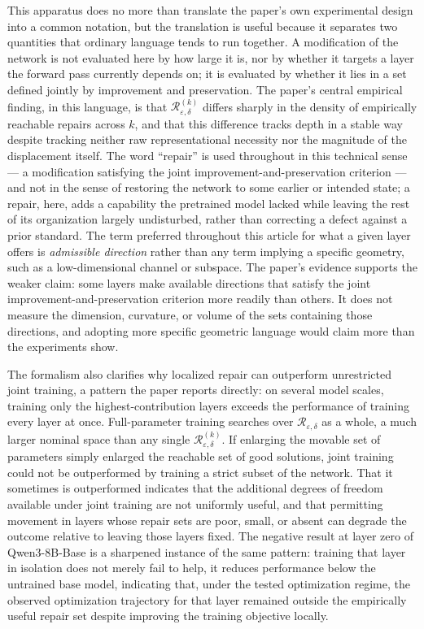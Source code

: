 \documentclass[11pt]{article}
\begin{document}
This apparatus does no more than translate the paper's own experimental design into a common notation, but the translation is useful because it separates two quantities that ordinary language tends to run together. A modification of the network is not evaluated here by how large it is, nor by whether it targets a layer the forward pass currently depends on; it is evaluated by whether it lies in a set defined jointly by improvement and preservation. The paper's central empirical finding, in this language, is that $\mathcal{R}^{(k)}_{\varepsilon,\delta}$ differs sharply in the density of empirically reachable repairs across $k$, and that this difference tracks depth in a stable way despite tracking neither raw representational necessity nor the magnitude of the displacement itself. The word ``repair'' is used throughout in this technical sense --- a modification satisfying the joint improvement-and-preservation criterion --- and not in the sense of restoring the network to some earlier or intended state; a repair, here, adds a capability the pretrained model lacked while leaving the rest of its organization largely undisturbed, rather than correcting a defect against a prior standard. The term preferred throughout this article for what a given layer offers is \emph{admissible direction} rather than any term implying a specific geometry, such as a low-dimensional channel or subspace. The paper's evidence supports the weaker claim: some layers make available directions that satisfy the joint improvement-and-preservation criterion more readily than others. It does not measure the dimension, curvature, or volume of the sets containing those directions, and adopting more specific geometric language would claim more than the experiments show.

The formalism also clarifies why localized repair can outperform unrestricted joint training, a pattern the paper reports directly: on several model scales, training only the highest-contribution layers exceeds the performance of training every layer at once. Full-parameter training searches over $\mathcal{R}_{\varepsilon,\delta}$ as a whole, a much larger nominal space than any single $\mathcal{R}^{(k)}_{\varepsilon,\delta}$. If enlarging the movable set of parameters simply enlarged the reachable set of good solutions, joint training could not be outperformed by training a strict subset of the network. That it sometimes is outperformed indicates that the additional degrees of freedom available under joint training are not uniformly useful, and that permitting movement in layers whose repair sets are poor, small, or absent can degrade the outcome relative to leaving those layers fixed. The negative result at layer zero of Qwen3-8B-Base is a sharpened instance of the same pattern: training that layer in isolation does not merely fail to help, it reduces performance below the untrained base model, indicating that, under the tested optimization regime, the observed optimization trajectory for that layer remained outside the empirically useful repair set despite improving the training objective locally.
\end{document}
